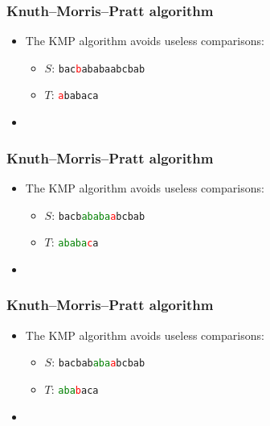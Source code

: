 \begin{frame}
    \frametitle{Knuth--Morris--Pratt algorithm}
    \begin{itemize}
    \item The KMP algorithm avoids useless comparisons:
        \begin{itemize}
            \item $S$: \texttt{bac\textcolor{red}{b}ababaabcbab}
            \item $T$: \texttt{\textcolor{red}{a}babaca}
        \end{itemize}
    \item[] \phantom{The number of shifts depend on which characters are currently matched}
    \end{itemize}
\end{frame}
\begin{frame}
    \frametitle{Knuth--Morris--Pratt algorithm}
    \begin{itemize}
    \item The KMP algorithm avoids useless comparisons:
        \begin{itemize}
            \item $S$: \texttt{bacb\textcolor{green}{ababa}\textcolor{red}{a}bcbab}
            \item $T$: \texttt{\textcolor{green}{ababa}\textcolor{red}{c}a}
        \end{itemize}
    \item[] \phantom{The number of shifts depend on which characters are currently matched}
    \end{itemize}
\end{frame}
\begin{frame}
    \frametitle{Knuth--Morris--Pratt algorithm}
    \begin{itemize}
    \item The KMP algorithm avoids useless comparisons:
        \begin{itemize}
            \item $S$: \texttt{bacbab\textcolor{green}{aba}\textcolor{red}{a}bcbab}
            \item $T$: \texttt{\textcolor{green}{aba}\textcolor{red}{b}aca}
        \end{itemize}
    \item[] \phantom{The number of shifts depend on which characters are currently matched}
    \end{itemize}
\end{frame}
